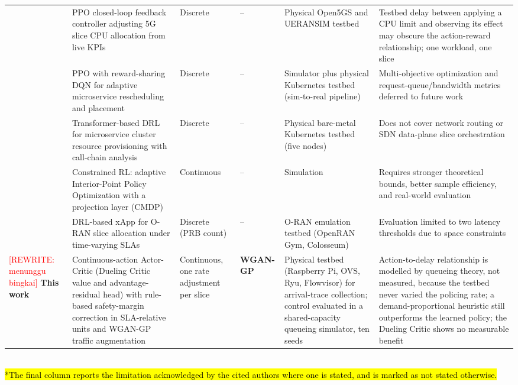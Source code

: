\documentclass[conference]{IEEEtran}
\newcommand{\rev}[1]{\hl{#1}}
\begin{document}
\begin{table}[t]
\begin{tabular}{p{1.1cm}p{3.3cm}p{1.7cm}p{1.2cm}p{2.7cm}p{4.3cm}}
\cite{b46} & PPO closed-loop feedback controller adjusting 5G slice CPU allocation from live KPIs & Discrete & -- & Physical Open5GS and UERANSIM testbed & Testbed delay between applying a CPU limit and observing its effect may obscure the action-reward relationship; one workload, one slice \\
\cite{b47} & PPO with reward-sharing DQN for adaptive microservice rescheduling and placement & Discrete & -- & Simulator plus physical Kubernetes testbed (sim-to-real pipeline) & Multi-objective optimization and request-queue/bandwidth metrics deferred to future work \\
\cite{b48} & Transformer-based DRL for microservice cluster resource provisioning with call-chain analysis & Discrete & -- & Physical bare-metal Kubernetes testbed (five nodes) & Does not cover network routing or SDN data-plane slice orchestration \\
\cite{b49} & Constrained RL: adaptive Interior-Point Policy Optimization with a projection layer (CMDP) & Continuous & -- & Simulation & Requires stronger theoretical bounds, better sample efficiency, and real-world evaluation \\
\cite{b50} & DRL-based xApp for O-RAN slice allocation under time-varying SLAs & Discrete (PRB count) & -- & O-RAN emulation testbed (OpenRAN Gym, Colosseum) & Evaluation limited to two latency thresholds due to space constraints \\
\midrule
\textcolor{red}{[REWRITE: menunggu bingkai]} \textbf{This work} & Continuous-action Actor-Critic (Dueling Critic value and advantage-residual head) with rule-based safety-margin correction in SLA-relative units and WGAN-GP traffic augmentation & Continuous, one rate adjustment per slice & \textbf{WGAN-GP} & Physical testbed (Raspberry Pi, OVS, Ryu, Flowvisor) for arrival-trace collection; control evaluated in a shared-capacity queueing simulator, ten seeds & Action-to-delay relationship is modelled by queueing theory, not measured, because the testbed never varied the policing rate; a demand-proportional heuristic still outperforms the learned policy; the Dueling Critic shows no measurable benefit \\
\bottomrule
\end{tabular}
\\[2pt]
\footnotesize{\rev{*The final column reports the limitation acknowledged by the cited authors where one is stated, and is marked as not stated otherwise.}}
\end{table}
\end{document}

